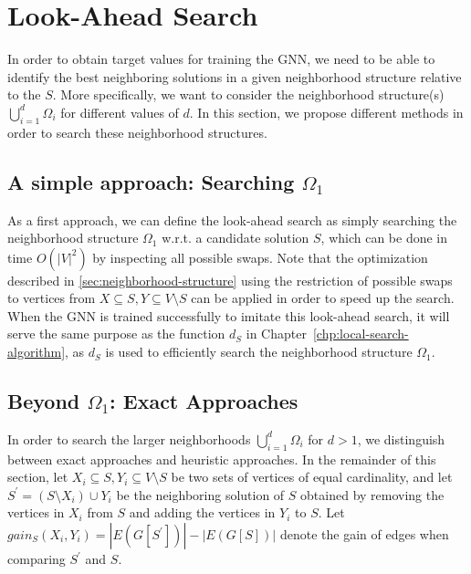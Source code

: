 \documentclass[draft,final]{vutinfth} %
\begin{document}
\section{Look-Ahead Search}\label{sec:lookahead-search}

In order to obtain target values for training the GNN, we need to be able to identify the best neighboring solutions in a given neighborhood structure relative to the $S$. More specifically, we want to consider the neighborhood structure(s) $\bigcup_{i=1}^d \Omega_i$ for different values of $d$. In this section, we propose different methods in order to search these neighborhood structures. 

\subsection{A simple approach: Searching $\Omega_1$}

As a first approach, we can define the look-ahead search as simply searching the neighborhood structure $\Omega_1$ w.r.t. a candidate solution $S$, which can be done in time $O(|V|^2)$ by inspecting all possible swaps. Note that the optimization described in \ref{sec:neighborhood-structure} using the restriction of possible swaps to vertices from $X \subseteq S, Y \subseteq V \setminus S$ can be applied in order to speed up the search. 
When the GNN is trained successfully to imitate this look-ahead search, it will serve the same purpose as the function $d_S$ in Chapter~\ref{chp:local-search-algorithm}, as $d_S$ is used to efficiently search the neighborhood structure $\Omega_1$. 

\subsection{Beyond $\Omega_1$: Exact Approaches}

In order to search the larger neighborhoods $\bigcup_{i=1}^d \Omega_i$ for $d > 1$, we distinguish between exact approaches and heuristic approaches. 
In the remainder of this section, let $X_i \subseteq S, Y_i \subseteq V\setminus S$ be two sets of vertices of equal cardinality, and let $S^\prime = (S \setminus X_i) \cup Y_i$ be the neighboring solution of $S$ obtained by removing the vertices in $X_i$ from $S$ and adding the vertices in $Y_i$ to $S$. Let $\mathit{gain_S}(X_i, Y_i) = |E(G[S^\prime])| - |E(G[S])|$ denote the gain of edges when comparing $S^\prime$ and $S$.   
\end{document}
